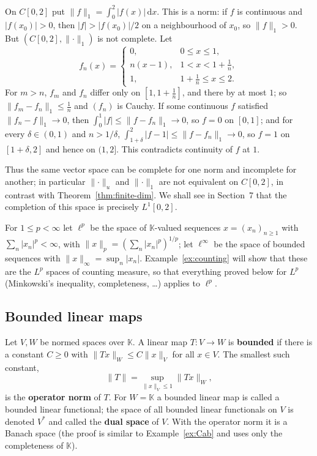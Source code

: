 \documentclass[11pt]{article}
\newcommand{\K}{\mathbb{K}}
\newcommand{\norm}[1]{\lVert #1\rVert}
\newcommand{\dx}{\,\mathrm{d}x}
\begin{document}
\begin{example}\label{ex:C-L1}
On $C[0,2]$ put $\norm{f}_{1}=\int_{0}^{2}|f(x)|\dx$. This is a norm: if $f$ is continuous and $|f(x_{0})|>0$, then $|f|>|f(x_{0})|/2$ on a neighbourhood of $x_{0}$, so $\norm{f}_{1}>0$. But $(C[0,2],\norm{\cdot}_{1})$ is not complete. Let
\[
f_{n}(x)=\begin{cases}0,&0\le x\le1,\\ n(x-1),&1<x<1+\tfrac1n,\\ 1,&1+\tfrac1n\le x\le2.\end{cases}
\]
For $m>n$, $f_{m}$ and $f_{n}$ differ only on $[1,1+\frac1n]$, and there by at most $1$; so $\norm{f_{m}-f_{n}}_{1}\le\frac1n$ and $(f_{n})$ is Cauchy. If some continuous $f$ satisfied $\norm{f_{n}-f}_{1}\to0$, then $\int_{0}^{1}|f|\le\norm{f-f_{n}}_{1}\to0$, so $f=0$ on $[0,1]$; and for every $\delta\in(0,1)$ and $n>1/\delta$, $\int_{1+\delta}^{2}|f-1|\le\norm{f-f_{n}}_{1}\to0$, so $f=1$ on $[1+\delta,2]$ and hence on $(1,2]$. This contradicts continuity of $f$ at $1$.

Thus the same vector space can be complete for one norm and incomplete for another; in particular $\norm{\cdot}_{u}$ and $\norm{\cdot}_{1}$ are not equivalent on $C[0,2]$, in contrast with Theorem~\ref{thm:finite-dim}. We shall see in Section~7 that the completion of this space is precisely $L^{1}[0,2]$.
\end{example}

\begin{example}\label{ex:lp}
For $1\le p<\infty$ let $\ell^{p}$ be the space of $\K$-valued sequences $x=(x_{n})_{n\ge1}$ with $\sum_{n}|x_{n}|^{p}<\infty$, with $\norm{x}_{p}=(\sum_{n}|x_{n}|^{p})^{1/p}$; let $\ell^{\infty}$ be the space of bounded sequences with $\norm{x}_{\infty}=\sup_{n}|x_{n}|$. Example~\ref{ex:counting} will show that these are the $L^{p}$ spaces of counting measure, so that everything proved below for $L^{p}$ (Minkowski's inequality, completeness, \dots) applies to $\ell^{p}$.
\end{example}

\subsection{Bounded linear maps}

\begin{definition}
Let $V,W$ be normed spaces over $\K$. A linear map $T:V\to W$ is \textbf{bounded} if there is a constant $C\ge0$ with $\norm{Tx}_{W}\le C\norm{x}_{V}$ for all $x\in V$. The smallest such constant,
\[
\norm{T}=\sup_{\norm{x}_{V}\le1}\norm{Tx}_{W},
\]
is the \textbf{operator norm} of $T$. For $W=\K$ a bounded linear map is called a bounded linear functional; the space of all bounded linear functionals on $V$ is denoted $V^{*}$ and called the \textbf{dual space} of $V$. With the operator norm it is a Banach space (the proof is similar to Example~\ref{ex:Cab} and uses only the completeness of $\K$).
\end{definition}
\end{document}
